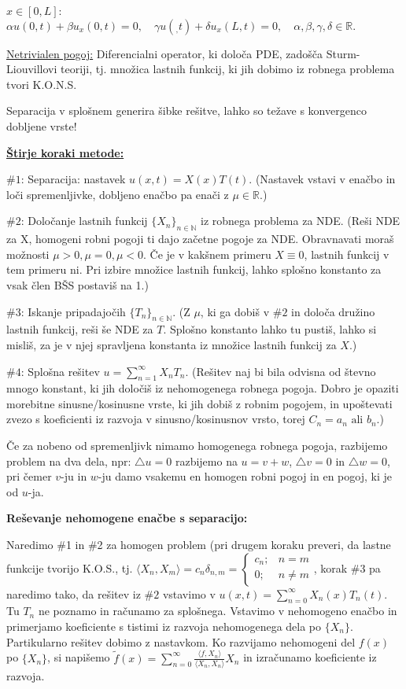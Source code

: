 \documentclass[11pt,a4paper]{amsart}
\theoremstyle{definition} %
\theoremstyle{plain} %
\newcommand{\R}{\mathbb R}
\newcommand{\N}{\mathbb N}
\begin{document}
$x \in [0,L]$: $\alpha u(0,t) + \beta u_x(0,t) = 0, \quad \gamma u(_,t)+\delta
u_x(L,t) = 0, \quad \alpha, \beta, \gamma, \delta \in \R.$

\underline{Netrivialen pogoj:} Diferencialni operator, ki določa PDE, zadošča
Sturm-Liouvillovi teoriji, tj. množica lastnih funkcij, ki jih dobimo iz robnega
problema tvori K.O.N.S.

Separacija v splošnem generira šibke rešitve, lahko so težave s konvergenco dobljene vrste!

\underline{\textbf{Štirje koraki metode:}}

$\#1$: Separacija: nastavek $u(x,t)=X(x)T(t)$. (Nastavek vstavi v enačbo in loči
spremenljivke, dobljeno enačbo pa enači z $\mu \in \R$.)

$\#2$: Določanje lastnih funkcij $\{X_n\}_{n\in \N}$ iz robnega problema za NDE.
(Reši NDE za X, homogeni robni pogoji ti dajo začetne pogoje za NDE. Obravnavati
moraš možnosti $\mu >0, \mu = 0, \mu < 0$. Če je v kakšnem primeru $X \equiv 0$,
lastnih funkcij v tem primeru ni. Pri izbire množice lastnih funkcij, lahko
splošno konstanto za vsak člen BŠS postaviš na 1.)

$\#3$: Iskanje pripadajočih $\{T_n \}_{n \in \N}$. (Z $\mu$, ki ga dobiš v $\#2$
in določa družino lastnih funkcij, reši še NDE za $T$. Splošno konstanto lahko
tu pustiš, lahko si misliš, za je v njej spravljena konstanta iz množice lastnih
funkcij za $X$.)

$\#4$: Splošna rešitev $u = \sum_{n=1}^\infty X_nT_n$. (Rešitev naj bi bila
odvisna od števno mnogo konstant, ki jih določiš iz nehomogenega robnega pogoja.
Dobro je opaziti morebitne sinusne/kosinusne vrste, ki jih dobiš z robnim
pogojem, in upoštevati zvezo s koeficienti iz razvoja v sinusno/kosinusnov
vrsto, torej $C_n = a_n \text{ ali } b_n$.)

Če za nobeno od spremenljivk nimamo homogenega robnega pogoja, razbijemo problem
na dva dela, npr: $\triangle u = 0$ razbijemo na $u = v+w$, $\triangle v = 0$ in
$\triangle w = 0$, pri čemer $v$-ju in $w$-ju damo vsakemu en homogen robni
pogoj in en pogoj, ki je od $u$-ja.

\textbf{Reševanje nehomogene enačbe s separacijo:}

Naredimo $\#$1 in $\#$2 za homogen problem (pri drugem koraku preveri, da lastne funkcije tvorijo K.O.S., tj. $\langle X_n,X_m \rangle = c_n \delta_{n,m} = \begin{cases} c_n; & n = m \\ 0; & n \neq m \end{cases}$, korak $\#$3 pa naredimo tako, da rešitev iz $\#2$ vstavimo v $u(x,t) = \sum_{n=0}^\infty X_n(x)T_n(t)$. Tu $T_n$ ne poznamo in računamo za splošnega. Vstavimo v nehomogeno enačbo in primerjamo koeficiente s tistimi iz razvoja nehomogenega dela po $\{X_n\}$. Partikularno rešitev dobimo z nastavkom. Ko razvijamo nehomogeni del $f(x)$ po $\{X_n\}$, si napišemo $\tilde{f}(x) = \sum_{n=0}^\infty \frac{\langle f,X_n \rangle}{\langle X_n,X_n \rangle}X_n$ in izračunamo koeficiente iz razvoja.
\end{document}
